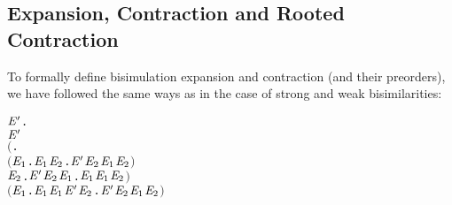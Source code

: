 \subsection{Expansion, Contraction and Rooted Contraction}

To formally define bisimulation expansion and contraction (and their preorders), we have
followed the same ways as in the case of strong and weak bisimilarities:
\begin{alltt}
  \HOLTokenDefEquality{}
  \HOLSymConst{\HOLTokenForall{}} \ensuremath{\HOLBoundVar{E}\sp{\prime}}.
        \ensuremath{\HOLBoundVar{E}\sp{\prime}} \HOLSymConst{\HOLTokenImp{}}
      \ensuremath{(}\HOLSymConst{\HOLTokenForall{}}.
           \ensuremath{(}\HOLSymConst{\HOLTokenForall{}}\ensuremath{\HOLBoundVar{E}\sb{\mathrm{1}}}.  \HOLTokenTransBegin{} \HOLTokenTransEnd \ensuremath{\HOLBoundVar{E}\sb{\mathrm{1}}} \HOLSymConst{\HOLTokenImp{}} \HOLSymConst{\HOLTokenExists{}}\ensuremath{\HOLBoundVar{E}\sb{\mathrm{2}}}. \ensuremath{\HOLBoundVar{E}\sp{\prime}} \HOLTokenTransBegin{} \HOLTokenTransEnd \ensuremath{\HOLBoundVar{E}\sb{\mathrm{2}}} \HOLSymConst{\HOLTokenConj{}}  \ensuremath{\HOLBoundVar{E}\sb{\mathrm{1}}} \ensuremath{\HOLBoundVar{E}\sb{\mathrm{2}}}\ensuremath{)} \HOLSymConst{\HOLTokenConj{}}
           \HOLSymConst{\HOLTokenForall{}}\ensuremath{\HOLBoundVar{E}\sb{\mathrm{2}}}. \ensuremath{\HOLBoundVar{E}\sp{\prime}} \HOLTokenTransBegin{} \HOLTokenTransEnd \ensuremath{\HOLBoundVar{E}\sb{\mathrm{2}}} \HOLSymConst{\HOLTokenImp{}} \HOLSymConst{\HOLTokenExists{}}\ensuremath{\HOLBoundVar{E}\sb{\mathrm{1}}}.  \HOLTokenWeakTransBegin{} \HOLTokenWeakTransEnd \ensuremath{\HOLBoundVar{E}\sb{\mathrm{1}}} \HOLSymConst{\HOLTokenConj{}}  \ensuremath{\HOLBoundVar{E}\sb{\mathrm{1}}} \ensuremath{\HOLBoundVar{E}\sb{\mathrm{2}}}\ensuremath{)} \HOLSymConst{\HOLTokenConj{}}
      \ensuremath{(}\HOLSymConst{\HOLTokenForall{}}\ensuremath{\HOLBoundVar{E}\sb{\mathrm{1}}}.  \HOLTokenTransBegin\HOLSymConst{\ensuremath{\tau}}\HOLTokenTransEnd \ensuremath{\HOLBoundVar{E}\sb{\mathrm{1}}} \HOLSymConst{\HOLTokenImp{}}  \ensuremath{\HOLBoundVar{E}\sb{\mathrm{1}}} \ensuremath{\HOLBoundVar{E}\sp{\prime}} \HOLSymConst{\HOLTokenDisj{}} \HOLSymConst{\HOLTokenExists{}}\ensuremath{\HOLBoundVar{E}\sb{\mathrm{2}}}. \ensuremath{\HOLBoundVar{E}\sp{\prime}} \HOLTokenTransBegin\HOLSymConst{\ensuremath{\tau}}\HOLTokenTransEnd \ensuremath{\HOLBoundVar{E}\sb{\mathrm{2}}} \HOLSymConst{\HOLTokenConj{}}  \ensuremath{\HOLBoundVar{E}\sb{\mathrm{1}}} \ensuremath{\HOLBoundVar{E}\sb{\mathrm{2}}}\ensuremath{)} \HOLSymConst{\HOLTokenConj{}}

\end{alltt}
